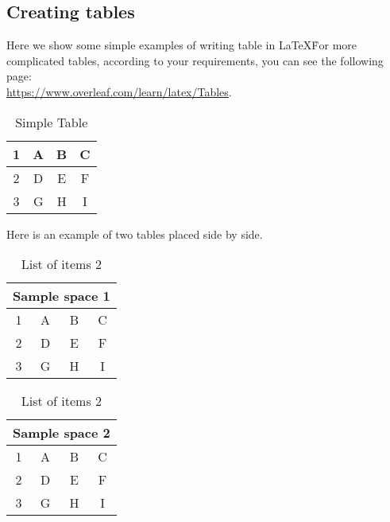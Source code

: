 \documentclass[11pt,a4paper,leqno]{article}
\numberwithin{equation}{subsection}
\theoremstyle{definition}
\begin{document}
\begin{enumerate}[(i)]
\begin{center}
	\end{center}
	
\end{enumerate}



\subsection{Creating tables}
Here we show some simple examples of writing table in \LaTeX\. For more complicated tables, according to your requirements, 
you can see the following page: \\
\noindent 
\href{https://www.overleaf.com/learn/latex/Tables}{https://www.overleaf.com/learn/latex/Tables}. 

\begin{table}[h!]
	\centering
		\begin{tabular}{|c|c|c|c|}
		\hline %
		1 & A & B & C \\ 
		\hline
		2 & D & E & F \\ 
		\hline
		3 & G & H & I \\ 
		\hline
	\end{tabular}
	\caption{Simple Table}
	\label{table:0}
\end{table}

\noindent
Here is an example of two tables placed side by side. 
\begin{table}[h!] %
\parbox{.45\linewidth}{
\centering 
	\begin{tabular}{|c|c|c|c|}
		\hline
		\multicolumn{4}{|c|}{Sample space 1} \\ 
		\hline
		1 & A & B & C \\ 
		\hline
		2 & D & E & F \\ 
		\hline
		3 & G & H & I \\ 
		\hline
	\end{tabular}
	\caption{List of items 1}
	\label{table:1}
}
\hfill
\parbox{.45\linewidth}{
\centering 
\begin{tabular}{|c|c|c|c|}
	\hline
	\multicolumn{4}{|c|}{Sample space 2} \\ 
	\hline
	1 & A & B & C \\ 
	\hline
	2 & D & E & F \\ 
	\hline
	3 & G & H & I \\ 
	\hline
\end{tabular}
\caption{List of items 2}
\label{table:2}
}
\end{table}
\end{document}
